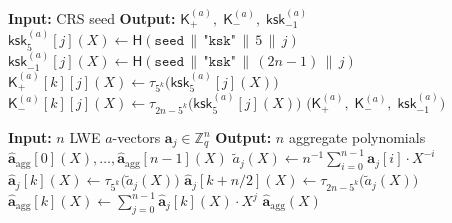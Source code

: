 \documentclass[11pt,a4paper]{article}
\newcommand{\Z}{\mathbb{Z}}
\begin{document}
\begin{algorithm}[H]
\caption{$\textsc{ExpandKSK}_a(\texttt{seed})$: Derive and expand KSK $a$-parts from seed.}
\label{alg:expand-ksk-a}
\begin{algorithmic}[1]
\State \textbf{Input:} CRS seed
\State \textbf{Output:} $\mathsf{K}_{+}^{(a)},\; \mathsf{K}_{-}^{(a)},\; \mathsf{ksk}_{-1}^{(a)}$
\Statex
{} 
    \State $\mathsf{ksk}_5^{(a)}[j](X) \gets \mathsf{H}(\texttt{seed} \,\|\, \texttt{"ksk"} \,\|\, 5 \,\|\, j)$
    \State $\mathsf{ksk}_{-1}^{(a)}[j](X) \gets \mathsf{H}(\texttt{seed} \,\|\, \texttt{"ksk"} \,\|\, (2n\!-\!1) \,\|\, j)$
\EndFor
\Statex
{} 
        \State $\mathsf{K}_{+}^{(a)}[k][j](X) \gets \tau_{5^k}\!\bigl(\mathsf{ksk}_5^{(a)}[j](X)\bigr)$ 
        \State $\mathsf{K}_{-}^{(a)}[k][j](X) \gets \tau_{2n-5^k}\!\bigl(\mathsf{ksk}_5^{(a)}[j](X)\bigr)$ 
    \EndFor
\EndFor
\State \Return $\bigl(\mathsf{K}_{+}^{(a)},\; \mathsf{K}_{-}^{(a)},\; \mathsf{ksk}_{-1}^{(a)}\bigr)$
\end{algorithmic}
\end{algorithm}

\begin{algorithm}[H]
\caption{$\textsc{RingEmbed}(\mathbf{a}_0, \ldots, \mathbf{a}_{n-1})$: Embed and aggregate $n$ LWE $a$-vectors.}
\label{alg:ring-embed}
\begin{algorithmic}[1]
\State \textbf{Input:} $n$ LWE $a$-vectors $\mathbf{a}_j \in \Z_q^n$
\State \textbf{Output:} $n$ aggregate polynomials $\hat{\mathbf{a}}_{\mathrm{agg}}[0](X), \ldots, \hat{\mathbf{a}}_{\mathrm{agg}}[n\!-\!1](X)$
\Statex
\State {}
    \State $\tilde{a}_j(X) \gets n^{-1} \sum_{i=0}^{n-1} \mathbf{a}_j[i] \cdot X^{-i}$ 
        \State $\hat{\mathbf{a}}_j[k](X) \gets \tau_{5^k}\!\bigl(\tilde{a}_j(X)\bigr)$ 
        \State $\hat{\mathbf{a}}_j[k + n/2](X) \gets \tau_{2n-5^k}\!\bigl(\tilde{a}_j(X)\bigr)$ 
    \EndFor
\EndFor
\Statex
\State {}
    \State $\hat{\mathbf{a}}_{\mathrm{agg}}[k](X) \gets \sum_{j=0}^{n-1} \hat{\mathbf{a}}_j[k](X) \cdot X^j$
\EndFor
\State \Return $\hat{\mathbf{a}}_{\mathrm{agg}}(X)$ 
\end{algorithmic}
\end{algorithm}
\end{document}
